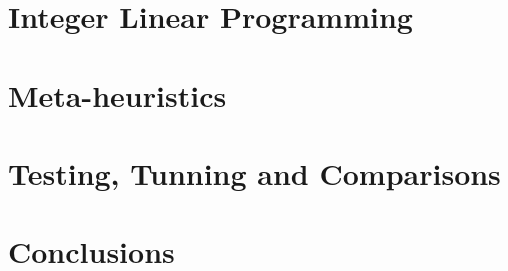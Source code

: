 \documentclass[a4paper]{article}
\begin{document}
\section{Integer Linear Programming}


\section{Meta-heuristics}





\section{Testing, Tunning and Comparisons}






\section{Conclusions}





\end{document}
